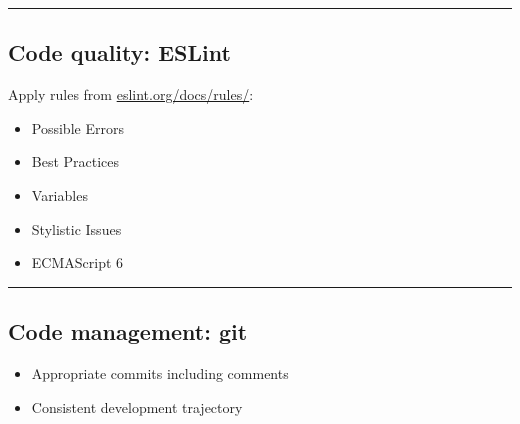 \documentclass{article}[18pt]
\providecommand{\tightlist}{%
	\setlength{\itemsep}{0pt}\setlength{\parskip}{0pt}}
\begin{document}
\begin{center}\rule{0.5\linewidth}{\linethickness}\end{center}

\hypertarget{code-quality-eslint}{%
	\subsection{Code quality: ESLint}\label{code-quality-eslint}}

Apply rules from
\href{https://eslint.org/docs/rules/}{eslint.org/docs/rules/}:

\begin{itemize}
	\tightlist
	\item
	Possible Errors
	\item
	Best Practices
	\item
	Variables
	\item
	Stylistic Issues
	\item
	ECMAScript 6
\end{itemize}

\begin{center}\rule{0.5\linewidth}{\linethickness}\end{center}

\hypertarget{code-management-git}{%
	\subsection{Code management: git}\label{code-management-git}}

\begin{itemize}
	\tightlist
	\item
	Appropriate commits including comments
	\item
	Consistent development trajectory
\end{itemize}
\end{document}
